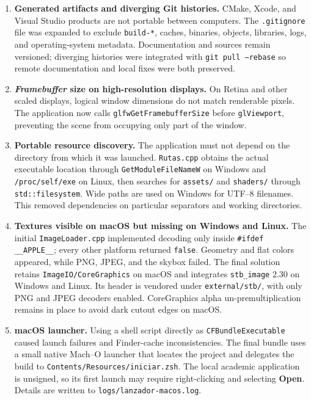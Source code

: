 \documentclass[letter,11pt]{article}
\begin{document}
	\begin{enumerate}[leftmargin=*]
		\item \textbf{Generated artifacts and diverging Git histories.}
		CMake, Xcode, and Visual Studio products are not portable between computers. The \texttt{.gitignore} file was expanded to exclude \texttt{build-*}, caches, binaries, objects, libraries, logs, and operating-system metadata. Documentation and sources remain versioned; diverging histories were integrated with \texttt{git pull --rebase} so remote documentation and local fixes were both preserved.

		\item \textbf{\textit{Framebuffer} size on high-resolution displays.}
		On Retina and other scaled displays, logical window dimensions do not match renderable pixels. The application now calls \texttt{glfwGetFramebufferSize} before \texttt{glViewport}, preventing the scene from occupying only part of the window.

		\item \textbf{Portable resource discovery.}
		The application must not depend on the directory from which it was launched. \texttt{Rutas.cpp} obtains the actual executable location through \texttt{GetModuleFileNameW} on Windows and \texttt{/proc/self/exe} on Linux, then searches for \texttt{assets/} and \texttt{shaders/} through \texttt{std::filesystem}. Wide paths are used on Windows for UTF--8 filenames. This removed dependencies on particular separators and working directories.

		\item \textbf{Textures visible on macOS but missing on Windows and Linux.}
		The initial \texttt{ImageLoader.cpp} implemented decoding only inside \texttt{\#ifdef \_\_APPLE\_\_}; every other platform returned \texttt{false}. Geometry and flat colors appeared, while PNG, JPEG, and the skybox failed. The final solution retains \texttt{ImageIO/CoreGraphics} on macOS and integrates \texttt{stb\_image} 2.30 on Windows and Linux. Its header is vendored under \texttt{external/stb/}, with only PNG and JPEG decoders enabled. CoreGraphics alpha un-premultiplication remains in place to avoid dark cutout edges on macOS.

		\item \textbf{macOS launcher.}
		Using a shell script directly as \texttt{CFBundleExecutable} caused launch failures and Finder-cache inconsistencies. The final bundle uses a small native Mach--O launcher that locates the project and delegates the build to \texttt{Contents/Resources/iniciar.zsh}. The local academic application is unsigned, so its first launch may require right-clicking and selecting \textbf{Open}. Details are written to \texttt{logs/lanzador-macos.log}.


\end{enumerate}
\end{document}
